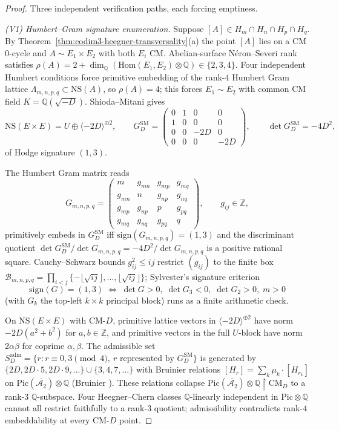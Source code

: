 \begin{proof}
Three independent verification paths, each forcing emptiness.

\emph{(V1) Humbert--Gram signature enumeration.} Suppose
$[A]\in H_m\cap H_n\cap H_p\cap H_q$. By
Theorem~\textup{\ref{thm:codim3-heegner-transversality}}(a) the
point $[A]$ lies on a CM $0$-cycle and $A\sim E_1\times E_2$ with
both $E_i$ CM. Abelian-surface N\'eron--Severi rank satisfies
$\rho(A)=2+\dim_{\mathbb Q}(\mathrm{Hom}(E_1,E_2)\otimes\mathbb Q)\in\{2,3,4\}$.
Four independent Humbert conditions force primitive embedding of
the rank-$4$ Humbert Gram lattice
$\Lambda_{m,n,p,q}\subset\mathrm{NS}(A)$, so $\rho(A)=4$; this
forces $E_1\sim E_2$ with common CM field
$K=\mathbb Q(\sqrt{-D})$. Shioda--Mitani
\cite[\S 1, Cor.~2]{ShiodaMitani1974} gives
\[
\mathrm{NS}(E\times E)=U\oplus\langle -2D\rangle^{\oplus 2},
\qquad
G^{\mathrm{SM}}_D=
\begin{pmatrix}0&1&0&0\\ 1&0&0&0\\ 0&0&-2D&0\\ 0&0&0&-2D\end{pmatrix},
\qquad\det G^{\mathrm{SM}}_D=-4D^2,
\]
of Hodge signature $(1,3)$.

The Humbert Gram matrix reads
\[
G_{m,n,p,q}=
\begin{pmatrix}
m & g_{mn} & g_{mp} & g_{mq}\\
g_{mn} & n & g_{np} & g_{nq}\\
g_{mp} & g_{np} & p & g_{pq}\\
g_{mq} & g_{nq} & g_{pq} & q
\end{pmatrix},\qquad g_{ij}\in\mathbb Z,
\]
primitively embeds in $G^{\mathrm{SM}}_D$ iff $\mathrm{sign}(G_{m,n,p,q})=(1,3)$
and the discriminant quotient
$\det G^{\mathrm{SM}}_D/\det G_{m,n,p,q}=-4D^2/\det G_{m,n,p,q}$
is a positive rational square. Cauchy--Schwarz bounds
$g_{ij}^2\leq ij$ restrict $(g_{ij})$ to the finite box
$\mathcal B_{m,n,p,q}=\prod_{i<j}\{-\lfloor\sqrt{ij}\rfloor,\ldots,\lfloor\sqrt{ij}\rfloor\}$;
Sylvester's signature criterion
\[
\mathrm{sign}(G)=(1,3)\;\Longleftrightarrow\;
\det G>0,\;\det G_3<0,\;\det G_2>0,\;m>0
\]
(with $G_k$ the top-left $k\times k$ principal block) runs as a
finite arithmetic check.

On $\mathrm{NS}(E\times E)$ with CM-$D$, primitive lattice vectors
in $\langle-2D\rangle^{\oplus 2}$ have norm $-2D(a^2+b^2)$ for
$a,b\in\mathbb Z$, and primitive vectors in the full $U$-block have
norm $2\alpha\beta$ for coprime $\alpha,\beta$. The admissible set
$S^{\mathrm{adm}}_D=\{r:r\equiv 0,3\pmod 4,\ r\text{ represented by }G^{\mathrm{SM}}_D\}$
is generated by $\{2D,2D\cdot 5,2D\cdot 9,\ldots\}\cup\{3,4,7,\ldots\}$
with Bruinier relations
$[H_r]=\sum_{k}\mu_k\cdot[H_{r_k}]$ on
$\mathrm{Pic}(\overline{\mathcal A_2})\otimes\mathbb Q$
(Bruinier \cite[Thm.~3.22, (3.36)]{Bruinier2002}). These relations
collapse $\mathrm{Pic}(\overline{\mathcal A_2})\otimes\mathbb Q\!\!\upharpoonright\!\mathrm{CM}_D$
to a rank-$3$ $\mathbb Q$-subspace. Four Heegner--Chern classes
$\mathbb Q$-linearly independent in $\mathrm{Pic}\otimes\mathbb Q$
cannot all restrict faithfully to a rank-$3$ quotient; admissibility
contradicts rank-$4$ embeddability at every CM-$D$ point.


\end{proof}
